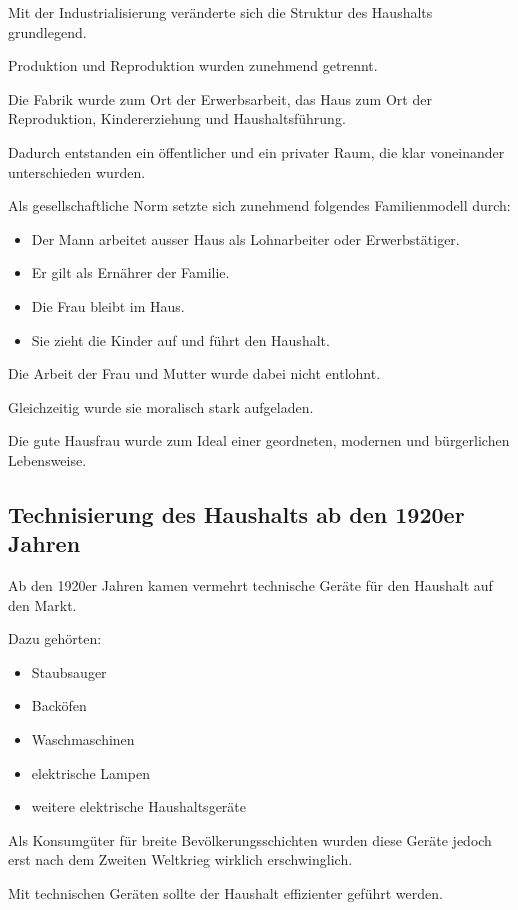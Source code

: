 Mit der Industrialisierung veränderte sich
die Struktur des Haushalts grundlegend.

Produktion und Reproduktion wurden zunehmend getrennt.

Die Fabrik wurde zum Ort der Erwerbsarbeit,
das Haus zum Ort der Reproduktion,
Kindererziehung und Haushaltsführung.

Dadurch entstanden ein öffentlicher
und ein privater Raum,
die klar voneinander unterschieden wurden.

Als gesellschaftliche Norm setzte sich zunehmend
folgendes Familienmodell durch:

\begin{itemize}
\item Der Mann arbeitet ausser Haus als Lohnarbeiter oder Erwerbstätiger.
\item Er gilt als Ernährer der Familie.
\item Die Frau bleibt im Haus.
\item Sie zieht die Kinder auf und führt den Haushalt.
\end{itemize}

Die Arbeit der Frau und Mutter
wurde dabei nicht entlohnt.

Gleichzeitig wurde sie moralisch stark aufgeladen.

Die gute Hausfrau wurde zum Ideal
einer geordneten,
modernen und bürgerlichen Lebensweise.

\subsection{Technisierung des Haushalts ab den 1920er Jahren}

Ab den 1920er Jahren kamen vermehrt technische Geräte
für den Haushalt auf den Markt.

Dazu gehörten:

\begin{itemize}
\item Staubsauger
\item Backöfen
\item Waschmaschinen
\item elektrische Lampen
\item weitere elektrische Haushaltsgeräte
\end{itemize}

Als Konsumgüter für breite Bevölkerungsschichten
wurden diese Geräte jedoch erst nach dem Zweiten Weltkrieg
wirklich erschwinglich.

Mit technischen Geräten sollte der Haushalt
effizienter geführt werden.

